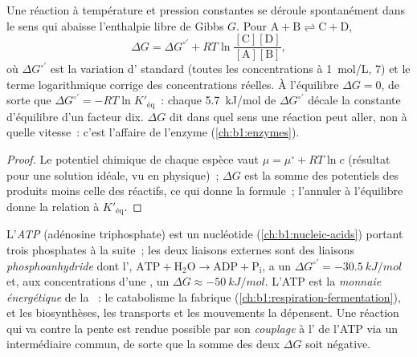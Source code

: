 \begin{proposition}\label{prop:b1:water-small-molecules:gibbs}
Une réaction à température et pression constantes se déroule
spontanément dans le sens qui abaisse l'enthalpie libre de Gibbs $G$.
Pour $\mathrm{A} + \mathrm{B} \rightleftharpoons \mathrm{C} + \mathrm{D}$,
\[
\Delta G = \Delta G^{\circ\prime} + RT\ln\frac{[\mathrm{C}][\mathrm{D}]}{[\mathrm{A}][\mathrm{B}]},
\]
où $\Delta G^{\circ\prime}$ est la variation d' standard
(toutes les concentrations à \qty{1}{mol/L},  7) et le terme
logarithmique corrige des concentrations réelles. À l'équilibre
$\Delta G = 0$, de sorte que
$\Delta G^{\circ\prime} = -RT\ln K'_{\text{éq}}$~: chaque
\qty{5.7}{kJ/mol} de $\Delta G^{\circ\prime}$ décale la constante
d'équilibre d'un facteur dix. $\Delta G$ dit dans quel sens une réaction
peut aller, non à quelle vitesse~: c'est l'affaire de l'enzyme
(\cref{ch:b1:enzymes}).
\end{proposition}
\begin{proof}
Le potentiel chimique de chaque espèce vaut $\mu = \mu^\circ + RT\ln c$
(résultat pour une solution idéale, vu en physique)~; $\Delta G$ est la
somme des potentiels des produits moins celle des réactifs, ce qui donne
la formule~; l'annuler à l'équilibre donne la relation à
$K'_{\text{éq}}$.
\end{proof}

\begin{definition}\label{def:b1:water-small-molecules:atp}
L'\emph{ATP} (adénosine triphosphate) est un nucléotide
(\cref{ch:b1:nucleic-acids}) portant trois phosphates à la suite~; les
deux liaisons externes sont des liaisons
\emph{phosphoanhydride} dont
l', $\mathrm{ATP} + \mathrm{H_2O} \to \mathrm{ADP} +
\mathrm{P_i}$, a un $\Delta G^{\circ\prime} = \qty{-30.5}{kJ/mol}$ et,
aux concentrations d'une , un
$\Delta G \approx \qty{-50}{kJ/mol}$. L'ATP est la \emph{monnaie
énergétique} de la ~: le catabolisme
la fabrique (\cref{ch:b1:respiration-fermentation}), et les
biosynthèses, les transports et les mouvements la dépensent. Une
réaction qui va contre la pente est rendue possible par son
\emph{couplage} à l' de l'ATP via
un intermédiaire commun, de sorte que la somme des deux $\Delta G$ soit
négative.
\end{definition}

